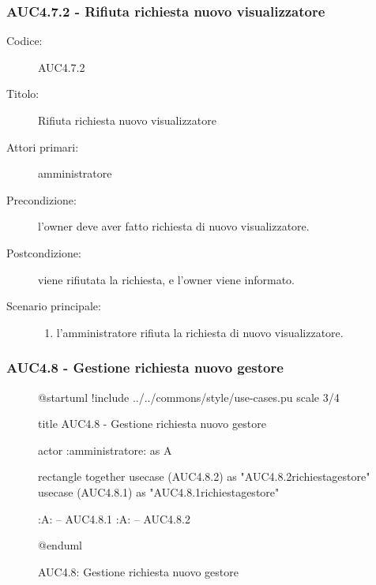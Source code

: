 \documentclass[casi-duso]{subfiles}
\begin{document}
\subsubsection{AUC4.7.2 - Rifiuta richiesta nuovo visualizzatore}%
\label{subsub:AUC4.7.2}
\begin{description}
  \item[Codice:] AUC4.7.2
  \item[Titolo:] Rifiuta richiesta nuovo visualizzatore
  \item[Attori primari:] amministratore
  \item[Precondizione:] l'owner deve aver fatto richiesta di nuovo visualizzatore.
  \item[Postcondizione:] viene rifiutata la richiesta, e l'owner viene informato.
  \item[Scenario principale:]
  \begin{enumerate}
    \item l'amministratore rifiuta la richiesta di nuovo visualizzatore.
  \end{enumerate}
\end{description}  

\subsubsection{AUC4.8 - Gestione richiesta nuovo gestore}%
\label{subsub:AUC4.8}

\begin{figure}[h!] 
  \centering 
  \begin{plantuml}
  @startuml
  !include ../../commons/style/use-cases.pu
  scale 3/4

  title AUC4.8 - Gestione richiesta nuovo gestore

  actor :amministratore: as A

  rectangle {
    together {
      usecase (AUC4.8.2) as "AUC4.8.2\nRifiuta richiesta\nnuovo gestore"
      usecase (AUC4.8.1) as "AUC4.8.1\nAccetta richiesta\nnuovo gestore"
    }
  }

  :A: -- AUC4.8.1
  :A: -- AUC4.8.2

  @enduml
  \end{plantuml} 
  \caption{AUC4.8: Gestione richiesta nuovo gestore} 
  \label{fig:auc4_8} 
\end{figure}
\end{document}
